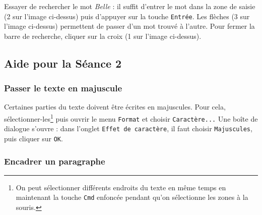
Essayer de rechercher le mot \emph{Belle} : il suffit d'entrer le mot dans la zone de saisie (2 sur l'image ci-dessus) puis d'appuyer sur la touche \texttt{Entrée}. Les flèches (3 sur l'image ci-dessus) permettent de passer d'un mot trouvé à l'autre. Pour fermer la barre de recherche, cliquer sur la croix (1 sur l'image ci-dessus).   


%
%



%
%
%
%


\subsection{Aide pour la Séance 2}\label{correction_texte02}


\subsubsection{Passer le texte en majuscule}

Certaines parties du texte doivent être écrites en majuscules. Pour cela, sélectionner-les\footnote{On peut sélectionner différents endroits du texte en même temps en maintenant la touche \texttt{Cmd} enfoncée pendant qu'on sélectionne les zones à la souris.} puis ouvrir le menu \texttt{Format} et choisir \texttt{Caractère...} Une boîte de dialogue s'ouvre : dans l'onglet \texttt{Effet de caractère}, il faut choisir \texttt{Majuscules}, puis cliquer sur \texttt{OK}.  










\subsubsection{Encadrer un paragraphe} 

